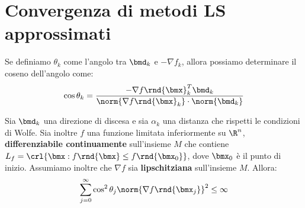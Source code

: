 \documentclass[\main/main.tex]{subfiles}
\begin{document}
\section{Convergenza di metodi LS approssimati}
Se definiamo \(\theta_k \) come l'angolo tra \(\bmd_k \) e \(-\nabla f_k \), allora possiamo determinare il coseno dell'angolo come:
\[
    \cos \theta_k = \frac{
        -\nabla {f\rnd{\bmx}}_k^T \bmd_k
    }{
        \norm{\nabla {f\rnd{\bmx}}_k} \cdot \norm{\bmd_k}
    }
\]
\begin{theorem}
    Sia \(\bmd_k\) una direzione di discesa e sia \(\alpha_k\) una distanza che rispetti le condizioni di Wolfe. Sia inoltre \(f\) una funzione limitata inferiormente su \(\R^n\), \textbf{differenziabile continuamente} sull'insieme \(M\) che contiene \(L_f = \crl{\bmx: f\rnd{\bmx} \leq f\rnd{\bmx_0}}\), dove \(\bmx_0\) è il punto di inizio. Assumiamo inoltre che \(\nabla f\) sia \textbf{lipschitziana} sull'insieme \(M\). Allora:
    \[
        \sum_{j=0}^{\infty} \cos^2 \theta_j \norm{\nabla f \rnd{\bmx_j}}^2 \leq \infty
    \]\end{theorem}
\end{document}
